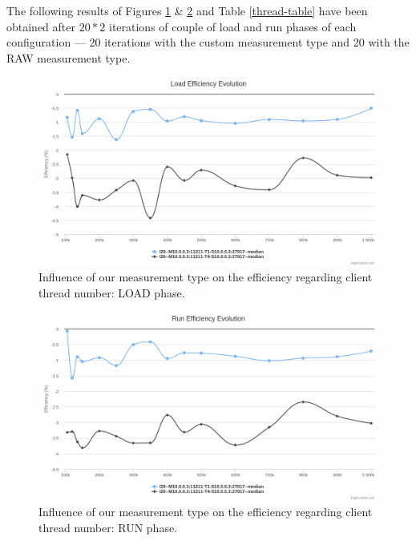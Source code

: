 \documentclass[a4paper,11pt]{report}
\begin{document}
The following results of Figures \ref{thread-SMremote-load}  \& \ref{thread-SMremote-run} and Table \ref{thread-table} have been obtained after $20*2$ iterations of couple of load and run phases of each configuration --- 20 iterations with the custom measurement type and 20 with the RAW measurement type.

\begin{figure}[ht]
\begin{center}
\includegraphics[width=1\linewidth]{images/evaluation/thread-SMremote-load.png}
\caption{Influence of our measurement type on the efficiency regarding client thread number: LOAD phase.}
\label{thread-SMremote-load}
\end{center}
\end{figure}

\begin{figure}[ht]
\begin{center}
\includegraphics[width=1\linewidth]{images/evaluation/thread-SMremote-run.png}
\caption{Influence of our measurement type on the efficiency regarding client thread number: RUN phase.}
\label{thread-SMremote-run}
\end{center}
\end{figure}
\end{document}
